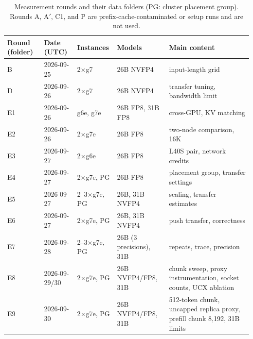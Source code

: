 \documentclass[11pt]{article}
\begin{document}
\begin{table}[H]
\centering\footnotesize
\begin{tabularx}{\linewidth}{llllL}
\toprule
Round (folder) & Date (UTC) & Instances & Models & Main content \\
\midrule
B  & 2026-09-25 & 2$\times$g7 & 26B NVFP4 & input-length grid \\
D  & 2026-09-26 & 2$\times$g7 & 26B NVFP4 & transfer tuning, bandwidth limit \\
E1 & 2026-09-26 & g6e, g7e & 26B FP8, 31B FP8 & cross-GPU, KV matching \\
E2 & 2026-09-26 & 2$\times$g7e & 26B FP8 & two-node comparison, 16K \\
E3 & 2026-09-27 & 2$\times$g6e & 26B FP8 & L40S pair, network credits \\
E4 & 2026-09-27 & 2$\times$g7e, PG & 26B FP8 & placement group, transfer settings \\
E5 & 2026-09-27 & 2--3$\times$g7e, PG & 26B, 31B NVFP4 & scaling, transfer estimates \\
E6 & 2026-09-27 & 2$\times$g7e, PG & 26B, 31B NVFP4 & push transfer, correctness \\
E7 & 2026-09-28 & 2--3$\times$g7e, PG & 26B (3 precisions), 31B & repeats, trace, precision \\
E8 & 2026-09-29/30 & 2$\times$g7e, PG & 26B NVFP4/FP8, 31B & chunk sweep, proxy instrumentation, socket counts, UCX ablation \\
E9 & 2026-09-30 & 2$\times$g7e, PG & 26B NVFP4/FP8, 31B & 512-token chunk, uncapped replica proxy, prefill chunk 8,192, 31B limits \\
\bottomrule
\end{tabularx}
\caption{Measurement rounds and their data folders (PG: cluster placement group). Rounds A, A$'$, C1, and P are prefix-cache-contaminated or setup runs and are not used.}
\label{tab:folders}
\end{table}
\end{document}
